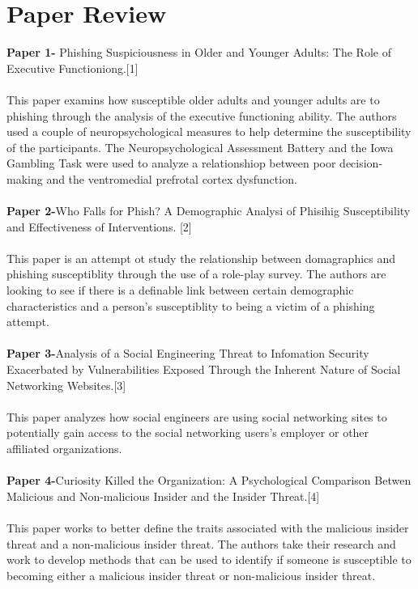 \documentclass[12pt]{article}
\begin{document}
\section*{Paper Review}
\textbf{Paper 1-} Phishing Suspiciousness in Older and Younger Adults: The Role of Executive Functioniong.[1] 
\\
\\
This paper examins how susceptible older adults and younger adults are to phishing through the analysis of the executive functioning ability. The authors used a couple of neuropsychological measures to help determine the susceptibility of the participants.  The Neuropsychological Assessment Battery and the Iowa Gambling Task were used to analyze a relationshiop between poor decision-making and the ventromedial prefrotal cortex dysfunction. 
\\
\\
\textbf {Paper 2-}Who Falls for Phish? A Demographic Analysi of Phisihig Susceptibility and Effectiveness of Interventions. [2]
\\
\\
This paper is an attempt ot study the relationship between domagraphics and phishing susceptiblity through the use of a role-play survey.  The authors are looking to see if there is a definable link between certain demographic characteristics and a person's susceptiblity to being a victim of a phishing attempt. 
\\
\\
\textbf {Paper 3-}Analysis of a Social Engineering Threat to Infomation Security Exacerbated by Vulnerabilities Exposed Through the Inherent Nature of Social Networking Websites.[3] 
\\
\\
This paper analyzes how social engineers are using social networking sites to potentially gain access to the social networking users's employer or other affiliated organizations. 
\\
\\
\textbf {Paper 4-}Curiosity Killed the Organization: A Psychological Comparison Betwen Malicious and Non-malicious Insider and the Insider Threat.[4]
\\
\\
This paper works to better define the traits associated with the malicious insider threat and a non-malicious insider threat. The authors take their research and work to develop methods that can be used to identify if someone is susceptible to becoming either a malicious insider threat or non-malicious insider threat. 
\end{document}
